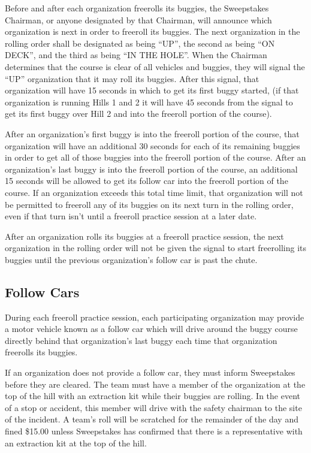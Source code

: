	Before and after each organization freerolls its buggies, the Sweepstakes Chairman, or anyone designated by that Chairman, will announce which organization is next in order to freeroll its buggies. The next organization in the rolling order shall be designated as being “UP”, the second as being “ON DECK”, and the third as being “IN THE HOLE”. When the Chairman determines that the course is clear of all vehicles and buggies, they will signal the “UP” organization that it may roll its buggies. After this signal, that organization will have 15 seconds in which to get its first buggy started, (if that organization is running Hills 1 and 2 it will have 45 seconds from the signal to get its first buggy over Hill 2 and into the freeroll portion of the course).

	After an organization's first buggy is into the freeroll portion of the course, that organization will have an additional 30 seconds for each of its remaining buggies in order to get all of those buggies into the freeroll portion of the course. After an organization's last buggy is into the freeroll portion of the course, an additional 15 seconds will be allowed to get its follow car into the freeroll portion of the course. If an organization exceeds this total time limit, that organization will not be permitted to freeroll any of its buggies on its next turn in the rolling order, even if that turn isn't until a freeroll practice session at a later date.

	After an organization rolls its buggies at a freeroll practice session, the next organization in the rolling order will not be given the signal to start freerolling its buggies until the previous organization's follow car is past the chute.

\subsection{Follow Cars}
\label{subsec:Follow Cars}

	During each freeroll practice session, each participating organization may provide a motor vehicle known as a follow car which will drive around the buggy course directly behind that organization's last buggy each time that organization freerolls its buggies.

	If an organization does not provide a follow car, they must inform Sweepstakes before they are cleared. The team must have a member of the organization at the top of the hill with an extraction kit while their buggies are rolling. In the event of a stop or accident, this member will drive with the safety chairman to the site of the incident. A team's roll will be scratched for the remainder of the day and fined \$15.00 unless Sweepstakes has confirmed that there is a representative with an extraction kit at the top of the hill.

